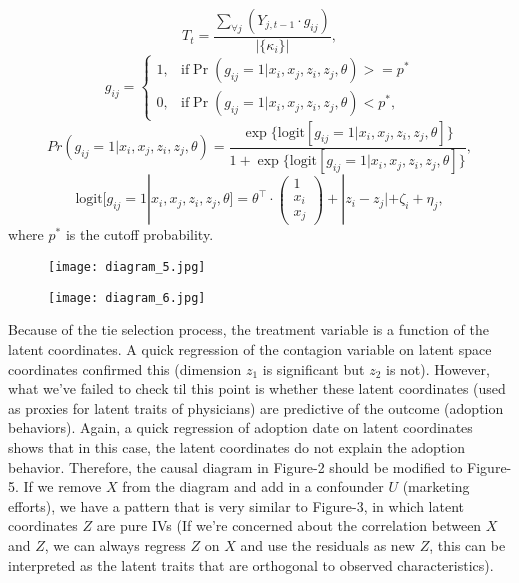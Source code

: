 \documentclass[11pt]{article}
\begin{document}
$$
T_{t}=\frac{\sum_{\forall j} (Y_{j,t-1}\cdot g_{ij})}{|\{\kappa_i\}|},$$
$$g_{ij} = 
\begin{cases}
1, & \text{if}   \Pr(g_{ij}=1|x_i,x_j,z_i,z_j,\theta) >= p^* \\
0, & \text{if}   \Pr(g_{ij}=1|x_i,x_j,z_i,z_j,\theta) < p^*,
\end{cases}
$$
$$Pr(g_{ij}=1|x_i,x_j,z_i,z_j,\theta) = \frac{\exp\{\text{logit}[g_{ij}=1|x_i,x_j,z_i,z_j,\theta]\}}{1+\exp\{\text{logit}[g_{ij}=1|x_i,x_j,z_i,z_j,\theta]\}},$$
$$\text{logit}[g_{ij}=1|x_i,x_j,z_i,z_j,\theta]=\theta^\intercal \cdot \begin{pmatrix}
1\\x_i\\x_j \end{pmatrix} + |z_i - z_j| + \zeta_i + \eta_j,$$
where $p^*$ is the cutoff probability.\\

\begin{figure}
\centering
\begin{minipage}{.5\textwidth}
 \centering
 \hspace*{-1.2in} %
  \texttt{[image: diagram\_5.jpg]}
  \label{fig:diagram1}
\end{minipage}%
\begin{minipage}{.5\textwidth}
\centering
\hspace*{-0.2in} %
  \texttt{[image: diagram\_6.jpg]}
  \label{fig:diagram2}
\end{minipage}
\end{figure}



Because of the tie selection process, the treatment variable is a function of the latent coordinates. A quick regression of the contagion variable on latent space coordinates confirmed this (dimension $z_1$ is significant but $z_2$ is not). However, what we've failed to check til this point is whether these latent coordinates (used as proxies for latent traits of physicians) are predictive of the outcome (adoption behaviors). Again, a quick regression of adoption date on latent coordinates shows that in this case, the latent coordinates do not explain the adoption behavior. Therefore, the causal diagram in Figure-2 should be modified to Figure-5. If we remove $X$ from the diagram and add in a confounder $U$ (marketing efforts), we have a pattern that is very similar to Figure-3, in which latent coordinates $Z$ are pure IVs (If we're concerned about the correlation between $X$ and $Z$, we can always regress $Z$ on $X$ and use the residuals as new $Z$, this can be interpreted as the latent traits that are orthogonal to observed characteristics).\\
\end{document}

